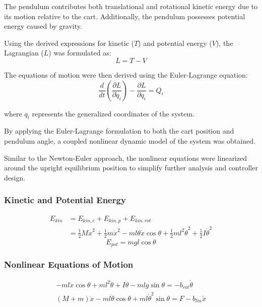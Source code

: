 The pendulum contributes both translational and rotational kinetic energy due to its motion relative to the cart. Additionally, the pendulum possesses potential energy caused by gravity.

Using the derived expressions for kinetic ($T$) and potential energy ($V$), the Lagrangian ($L$) was formulated as:
\begin{equation}
	L = T - V
\end{equation}

The equations of motion were then derived using the Euler-Lagrange equation:
\begin{equation}
	\frac{d}{dt}
	\left(
	\frac{\partial L}{\partial \dot{q}_i}
	\right)
	-
	\frac{\partial L}{\partial q_i}
	=
	Q_i
\end{equation}

where $q_i$ represents the generalized coordinates of the system.

By applying the Euler-Lagrange formulation to both the cart position and pendulum angle, a coupled nonlinear dynamic model of the system was obtained.

Similar to the Newton-Euler approach, the nonlinear equations were linearized around the upright equilibrium position to simplify further analysis and controller design.

\subsubsection{Kinetic and Potential Energy}

\begin{align}
	E_{kin} &= E_{kin,c} + E_{kin,p} + E_{kin,rot} \\
	&=
	\frac{1}{2}M\dot{x}^2
	+
	\frac{1}{2}m\dot{x}^2
	-
	ml\dot{\theta}\dot{x}\cos\theta
	+
	\frac{1}{2}ml^2\dot{\theta}^2
	+
	\frac{1}{2}I\dot{\theta}^2
\end{align}
\begin{equation}
	E_{pot} = mgl\cos\theta
\end{equation}

\subsubsection{Nonlinear Equations of Motion}

\begin{align}
	-ml\ddot{x}\cos\theta+ml^2\ddot{\theta}+I\ddot{\theta}-mlg\sin\theta=-b_{rot}\dot{\theta} \\
	(M+m)\ddot{x} - ml\ddot{\theta}\cos\theta + ml\dot{\theta}^2\sin\theta = F - b_{lin}\dot{x}
\end{align}

